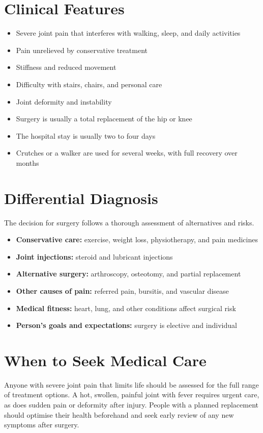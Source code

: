 \section*{Clinical Features}
\begin{itemize}
    \item Severe joint pain that interferes with walking, sleep, and daily activities
    \item Pain unrelieved by conservative treatment
    \item Stiffness and reduced movement
    \item Difficulty with stairs, chairs, and personal care
    \item Joint deformity and instability
    \item Surgery is usually a total replacement of the hip or knee
    \item The hospital stay is usually two to four days
    \item Crutches or a walker are used for several weeks, with full recovery over months
\end{itemize}

\section*{Differential Diagnosis}
The decision for surgery follows a thorough assessment of alternatives and risks.
\begin{itemize}
    \item \textbf{Conservative care:} exercise, weight loss, physiotherapy, and pain medicines
    \item \textbf{Joint injections:} steroid and lubricant injections
    \item \textbf{Alternative surgery:} arthroscopy, osteotomy, and partial replacement
    \item \textbf{Other causes of pain:} referred pain, bursitis, and vascular disease
    \item \textbf{Medical fitness:} heart, lung, and other conditions affect surgical risk
    \item \textbf{Person's goals and expectations:} surgery is elective and individual
\end{itemize}

\section*{When to Seek Medical Care}
Anyone with severe joint pain that limits life should be assessed for the full range of treatment options. A hot, swollen, painful joint with fever requires urgent care, as does sudden pain or deformity after injury. People with a planned replacement should optimise their health beforehand and seek early review of any new symptoms after surgery.

